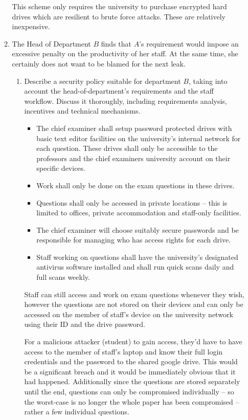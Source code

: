 \documentclass[10pt,\jkfside,a4paper]{article}
\begin{document}
\begin{enumerate}
\begin{enumerate}
This scheme only requires the university to purchase encrypted hard drives which are resilient
to brute force attacks. These are relatively inexpensive.

\item The Head of Department $B$ finds that $A$'s requirement would impose an excessive
penalty on the productivity of her staff. At the same time, she certainly does not want 
to be blamed for the next leak.

\begin{enumerate}[label=(\roman*)]

\item Describe a security policy suitable for department $B$, taking into account the 
head-of-department's requirements and the staff workflow. Discuss it thoroughly,
including requirements analysis, incentives and technical mechanisms.

\begin{itemize}

\item
The chief examiner shall setup password protected drives with basic text editor facilities
on the university's internal network for each question. These drives shall only be
accessible to the professors and the chief examiners university account on their
specific devices.

\item
Work shall only be done on the exam questions in these drives.

\item
Questions shall only be accessed in private locations -- this is limited to
offices, private accommodation and staff-only facilities.

\item
The chief examiner will choose suitably secure passwords and be responsible
for managing who has access rights for each drive.

\item
Staff working on questions shall have the university's designated antivirus
software installed and shall run quick scans daily and full scans weekly.

\end{itemize}

Staff can still access and work on exam questions whenever they wish, however
the questions are not stored on their devices and can only be accessed on the
member of staff's device on the university network using their ID and the drive
password.

For a malicious attacker (student) to gain access, they'd have to have access
to the member of staff's laptop and know their full login credentials and the
password to the shared google drive. This would be a significant breach and it
would be immediately obvious that it had happened.
Additionally since the questions are stored separately until the end, questions
can only be compromised individually -- so the worst-case is no longer the whole
paper has been compromised -- rather a few individual questions.


\end{enumerate}
\end{enumerate}
\end{enumerate}
\end{document}
